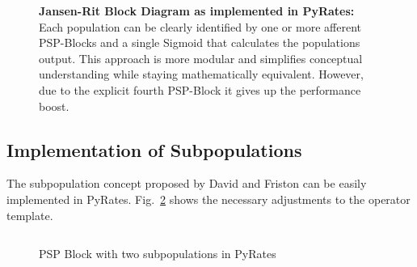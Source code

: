 \begin{figure}[H]

\caption{\textbf{Jansen-Rit Block Diagram as implemented in PyRates:} Each population can be
clearly identified by one or more afferent PSP-Blocks and a
single Sigmoid that calculates the populations output.
This approach is more modular and simplifies conceptual understanding while staying mathematically equivalent.
However, due to the explicit fourth PSP-Block it gives up the performance boost.
\quad{} }
\label{fig:pyratesJRBlock}
\end{figure}

\subsection{Implementation of Subpopulations}\label{subsec:implementation-of-subpopulations}
The subpopulation concept proposed by David and Friston can be easily implemented in PyRates.
Fig.~\ref{fig:subpop_pyrates} shows the necessary adjustments to the operator template.

\begin{figure}[H]
	\inputminted[mathescape, frame=lines, linenos, fontsize=\footnotesize, baselinestretch=1.2,
        bgcolor=LightGray, tabsize=4]
	{python3}{Chapters/Chapter_02_Technical_Concepts/code/psp_subpop.py}
	
	\caption{PSP Block with two subpopulations in PyRates}\label{fig:subpop_pyrates}
\end{figure}



